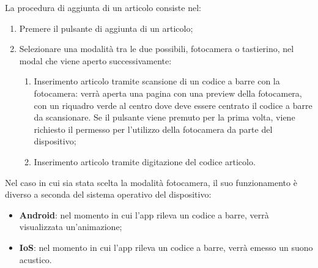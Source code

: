 La procedura di aggiunta di un articolo consiste nel:
\begin{enumerate}
	\item Premere il pulsante di aggiunta di un articolo;
	\item Selezionare una modalità tra le due possibili, fotocamera o tastierino, nel modal che viene aperto successivamente:
		\begin{enumerate}
			\item Inserimento articolo tramite scansione di un codice a barre con la fotocamera: verrà aperta una pagina con una preview
			della fotocamera, con un riquadro verde al centro dove deve essere centrato il codice a barre da scansionare. Se il pulsante viene
			premuto per la prima volta, viene richiesto il permesso per l'utilizzo della fotocamera da parte del dispositivo;
			\item Inserimento articolo tramite digitazione del codice articolo.
		\end{enumerate}
\end{enumerate}

Nel caso in cui sia stata scelta la modalità fotocamera, il suo funzionamento è diverso a seconda del sistema operativo del dispositivo:
\begin{itemize}
	\item \textbf{Android}: nel momento in cui l'app rileva un codice a barre, verrà visualizzata un'animazione;
	\item \textbf{IoS}: nel momento in cui l'app rileva un codice a barre, verrà emesso un suono acustico.
\end{itemize}

\newpage

